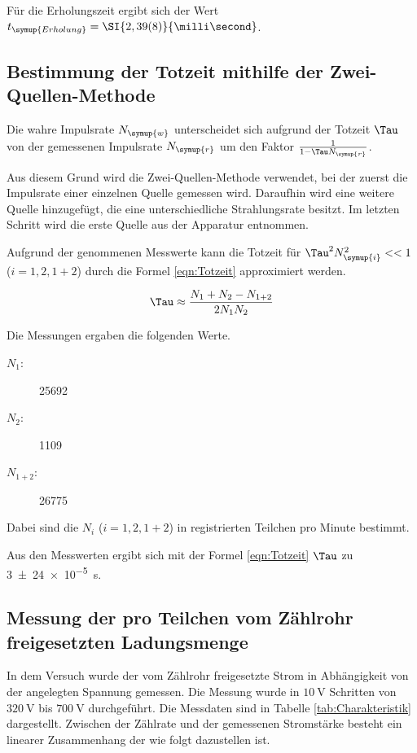 Für die Erholungszeit ergibt sich der Wert $t_{\symup{Erholung}} = \SI{2,39(8)}{\milli\second}$.

\subsection{Bestimmung der Totzeit mithilfe der Zwei-Quellen-Methode}

Die wahre Impulsrate $N_{\symup{w}}$ unterscheidet sich aufgrund der Totzeit $\Tau$ von der
gemessenen Impulsrate $N_{\symup{r}}$ um den Faktor $\frac{1}{1-\Tau N_{\symup{r}}}$.

Aus diesem Grund wird die Zwei-Quellen-Methode verwendet, bei der
zuerst die Impulsrate einer einzelnen Quelle gemessen wird.
Daraufhin wird eine weitere Quelle hinzugefügt, die eine unterschiedliche
Strahlungsrate besitzt. Im letzten Schritt wird die erste Quelle aus der
Apparatur entnommen.

Aufgrund der genommenen Messwerte kann die Totzeit für $\Tau^2N_{\symup{i}}^2 << 1$
($i = 1, 2, 1+2$) durch die Formel \eqref{eqn:Totzeit} approximiert werden.

\begin{equation}
  \label{eqn:Totzeit}
  \Tau \approx \frac{N_1 + N_2 - N_{1+2}}{2N_1N_2}
\end{equation}

Die Messungen ergaben die folgenden Werte.

\begin{description}
  \item[$N_1:$] 25692
  \item[$N_2:$] 1109
  \item[$N_{1+2}:$] 26775
\end{description}

Dabei sind die $N_i$ ($i = 1, 2, 1+2$) in registrierten Teilchen pro Minute bestimmt.

Aus den Messwerten ergibt sich mit der Formel \eqref{eqn:Totzeit}
$\Tau$ zu \SI{3(24)e-5}{\second}.

\subsection{Messung der pro Teilchen vom Zählrohr freigesetzten Ladungsmenge}

In dem Versuch wurde der vom Zählrohr freigesetzte Strom
in Abhängigkeit von der angelegten Spannung gemessen.
Die Messung wurde in $\SI{10}{\volt}$ Schritten von
$\SI{320}{\volt}$ bis $\SI{700}{\volt}$ durchgeführt.
Die Messdaten sind in Tabelle \ref{tab:Charakteristik} dargestellt.
Zwischen der Zählrate und der gemessenen Stromstärke besteht ein
linearer Zusammenhang der wie folgt dazustellen ist.

